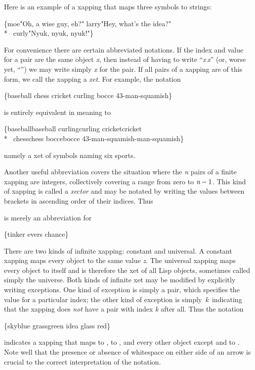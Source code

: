 \begin{defun}[Function]
\begin{new}
Here is an example of a xapping that maps three symbols to strings:
\begin{lisp}
\{moe\Xarrowright "Oh, a wise guy, eh?" larry\Xarrowright "Hey, what's the idea?" \\*
 ~curly\Xarrowright "Nyuk, nyuk, nyuk!"\}
\end{lisp}
For convenience there are certain abbreviated notations.
If the index and value for a pair are the same object \emph{x},
then instead of having to write ``\emph{x}\Xarrowright\,\emph{x}''
(or, worse yet, ``'')
we may write simply \emph{x} for the pair.
If all pairs of a xapping are of this form, we call the xapping a \emph{xet}.
For example, the notation
\begin{lisp}
\{baseball chess cricket curling bocce 43-man-squamish\}
\end{lisp}
is entirely equivalent in meaning to
\begin{lisp}
\{baseball\Xarrowright baseball curling\Xarrowright curling cricket\Xarrowright cricket \\*
~chess\Xarrowright chess bocce\Xarrowright bocce 43-man-squamish-man-squamish\}
\end{lisp}
namely a xet of symbols naming six sports.

Another useful abbreviation covers the situation where the \emph{n} pairs of a finite
xapping are integers, collectively covering a range from zero to $\emph{n}-1$.
This kind of xapping is called a \emph{xector} and may be notated by writing
the values between brackets in ascending order of their indices.
Thus
\begin{lisp}
\end{lisp}
is merely an abbreviation for
\begin{lisp}
\{tinker evers chance\}
\end{lisp}

There are two kinds of infinite xapping: constant and universal.
A constant xapping  maps every object to the same value \emph{z}.
The universal xapping \cd{\{\Xarrowright\}} maps every object to itself and is therefore the xet
of all Lisp objects, sometimes called simply the universe.
Both kinds of infinite xet may be modified by explicitly writing exceptions.
One kind of exception is simply a pair, which specifies the value for a particular index;
the other kind of exception is simply \,\emph{k}\Xarrowright\, indicating that the xapping does
\emph{not} have a pair with index \emph{k} after all.  Thus the notation
\begin{lisp}
\{sky\Xarrowright blue grass\Xarrowright green idea\Xarrowright{} glass\Xarrowright{} \Xarrowright red\}
\end{lisp}
indicates a xapping that maps  to ,  to ,
and every other object except  and  to .
Note well that the presence or absence of whitespace on either side
of an arrow is crucial to the correct interpretation
of the notation.


\end{new}
\end{defun}
